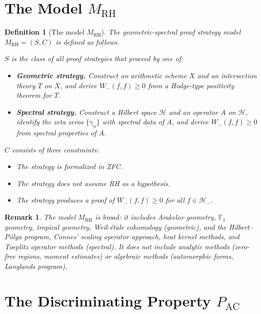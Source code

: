 \documentclass[12pt]{article}
\newtheorem{definition}[theorem]{Definition}
\newtheorem{remark}[theorem]{Remark}
\newcommand{\FF}{\mathbb{F}}
\newcommand{\Hminus}{\mathcal{H}_-}
\newcommand{\MRH}{M_{\mathrm{RH}}}
\newcommand{\PAC}{P_{\mathrm{AC}}}
\begin{document}
\section{The Model \texorpdfstring{$\MRH$}{M\_RH}}
\label{sec:model}

\begin{definition}[The model $\MRH$]
\label{def:model}
The \emph{geometric-spectral proof strategy model} $\MRH = (S, C)$
is defined as follows.

$S$ is the class of all proof strategies that proceed by one of:
\begin{itemize}
\item[\textup{(G)}] \textbf{Geometric strategy.} Construct an
  arithmetic scheme $X$ and an intersection theory $T$ on $X$,
  and derive $W_-(f,f) \geq 0$ from a Hodge-type positivity theorem
  for $T$.
\item[\textup{(S)}] \textbf{Spectral strategy.} Construct a Hilbert
  space $\mathcal{H}$ and an operator $A$ on $\mathcal{H}$, identify
  the zeta zeros $\{\gamma_n\}$ with spectral data of $A$, and derive
  $W_-(f,f) \geq 0$ from spectral properties of $A$.
\end{itemize}

$C$ consists of three constraints:
\begin{itemize}
\item[\textup{(C1)}] The strategy is formalized in ZFC.
\item[\textup{(C2)}] The strategy does not assume RH as a hypothesis.
\item[\textup{(C3)}] The strategy produces a proof of $W_-(f,f) \geq 0$
  for all $f \in \Hminus$.
\end{itemize}
\end{definition}

\begin{remark}
The model $\MRH$ is broad: it includes Arakelov geometry, $\FF_1$
geometry, tropical geometry, Weil-\'etale cohomology (geometric),
and the Hilbert--P\'olya program, Connes' scaling operator approach,
heat kernel methods, and Toeplitz operator methods (spectral). It
does not include analytic methods (zero-free regions, moment estimates)
or algebraic methods (automorphic forms, Langlands program).
\end{remark}

\section{The Discriminating Property \texorpdfstring{$\PAC$}{P\_AC}}
\label{sec:pac}
\end{document}
